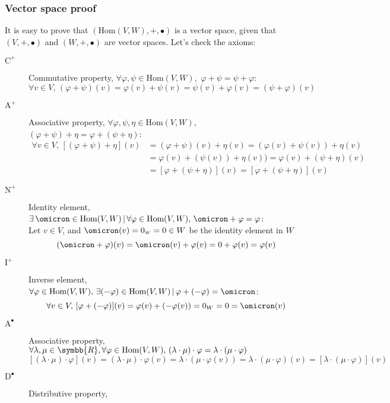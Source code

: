 \subsubsection{Vector space proof}
It is easy to prove that $(\text{Hom}(V,W), +, \vysmblkcircle)$ is a vector space,
given that $(V,+,\vysmblkcircle)$ and $(W,+,\vysmblkcircle)$ are vector spaces.
Let's check the axioms:
\begin{description}
\item[$\text{C}^+$] Commutative property, $\forall \varphi,\psi\in\text{Hom}(V,W)$,\,
  $\varphi + \psi = \psi + \varphi$:
  \[
    \forall v\in V,\,
    (\varphi + \psi)(v) = \varphi(v) + \psi(v) = \psi(v) + \varphi(v) = (\psi + \varphi)(v)
  \]
\item[$\text{A}^+$] Associative property, $\forall \varphi,\psi,\eta\in\text{Hom}(V,W)$,\,
  $(\varphi + \psi) + \eta = \varphi + (\psi + \eta)$:
  \begin{align*}
    \forall v\in V,\, 
    [(\varphi + \psi) + \eta](v)
    &= (\varphi + \psi)(v) + \eta(v)
      = (\varphi(v) + \psi(v)) + \eta(v)\\
    &= \varphi(v) + (\psi(v)) + \eta(v))
      =\varphi(v) + (\psi + \eta)(v)\\
    &= [\varphi + (\psi + \eta)](v)
      = [\varphi + (\psi + \eta)](v)
  \end{align*}
\item[$\text{N}^+$] Identity element,
  $\exists\,\omicron\in\text{Hom}(V,W)\, |\, \forall\varphi\in\text{Hom}(V,W),\,\omicron + \varphi = \varphi$:\\
  Let $v\in V$, and $\omicron(v) = 0_{\scriptscriptstyle W} = 0\in W$
  be the identity element in $W$
  \[
    (\omicron + \varphi)(v) = \omicron(v) + \varphi(v) = 0 + \varphi(v) = \varphi(v)
  \]
\item[$\text{I}^+$] Inverse element, $\forall\varphi\in\text{Hom}(V,W), \,\exists (-\varphi)\in\text{Hom}(V,W)
  \,|\, \varphi + (-\varphi) = \omicron$:
  \[
    \forall v\in V,\,[\varphi + (-\varphi)](v) = \varphi(v) + (-\varphi(v)) = 0_W = 0 = \omicron(v)
  \]
\item[$\text{A}^\vysmblkcircle$] Associative property,
  $\forall\lambda,\mu\in\symbb{R}, \forall\varphi\in\text{Hom}(V,W), \,(\lambda\cdot\mu) \cdot \varphi
  = \lambda\cdot(\mu\cdot \varphi)$
  \[
    [(\lambda\cdot\mu)\cdot \varphi](v)
    = (\lambda\cdot\mu) \cdot \varphi(v) = \lambda \cdot (\mu \cdot\varphi(v))
    = \lambda \cdot (\mu\cdot\varphi)(v)
    = [\lambda\cdot(\mu\cdot\varphi)](v)
  \]
\item[$\text{D}^\vysmblkcircle$] Distributive property,

\end{description}
